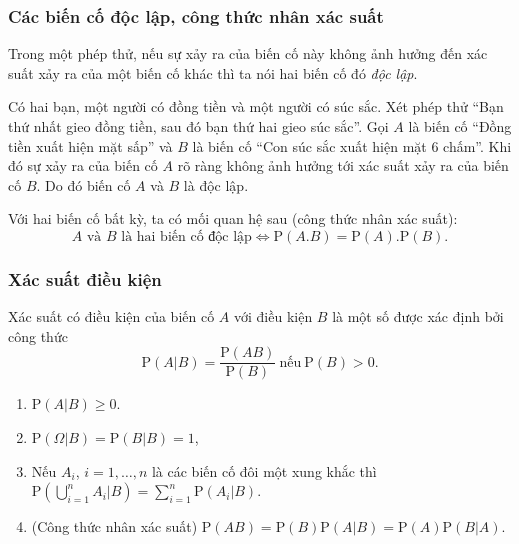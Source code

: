 \subsubsection{Các biến cố độc lập, công thức nhân xác suất}
\begin{kn}
	Trong một phép thử, nếu sự xảy ra của biến cố này không ảnh hưởng đến xác suất xảy ra của một biến cố khác thì ta nói hai biến cố đó \emph{độc lập}.
\end{kn}
\begin{vd}%
	Có hai bạn, một người có đồng tiền và một người có súc sắc. Xét phép thử ``Bạn thứ nhất gieo đồng tiền, sau đó bạn thứ hai gieo súc sắc''. Gọi $A$ là biến cố ``Đồng tiền xuất hiện mặt sấp'' và $B$ là biến cố ``Con súc sắc xuất hiện mặt 6 chấm''. Khi đó sự xảy ra của biến cố $A$ rõ ràng không ảnh hưởng tới xác suất xảy ra của biến cố $B$. Do đó biến cố $A$ và $B$ là độc lập.
\end{vd}
\begin{tc}
	Với hai biến cố bất kỳ, ta có mối quan hệ sau (công thức nhân xác suất):
	$$A \text{ và } B \text{ là hai biến cố độc lập}\Leftrightarrow \mathrm{P}(A.B)=\mathrm{P}(A).\mathrm{P}(B).$$
\end{tc}

\subsubsection{Xác suất điều kiện}

\begin{dn}
	Xác suất có điều kiện của biến cố $A$ với điều kiện $B$ là một số được xác định bởi công thức
	$$\mathrm{P}(A|B)=\dfrac{\mathrm{P}(AB)}{\mathrm{P}(B)}\ \text{nếu}\ \mathrm{P}(B)>0.$$
\end{dn}


\begin{tc}\hfill
	\begin{enumerate}
		\item $\mathrm{P}(A|B)\ge 0$.
		\item $\mathrm{P}(\Omega|B)=\mathrm{P}(B|B)=1$,
		\item Nếu $A_i$, $i=1,\ldots,n$ là các biến cố đôi một xung khắc thì
		$\mathrm{P}\left(\bigcup\limits_{i=1}^n A_i | B\right)=\displaystyle\sum\limits_{i=1}^n\mathrm{P}(A_i|B)$.
		\item (Công thức nhân xác suất) $\mathrm{P}(AB)=\mathrm{P}(B)\mathrm{P}(A|B)=\mathrm{P}(A)\mathrm{P}(B|A)$.
	\end{enumerate}
\end{tc}

